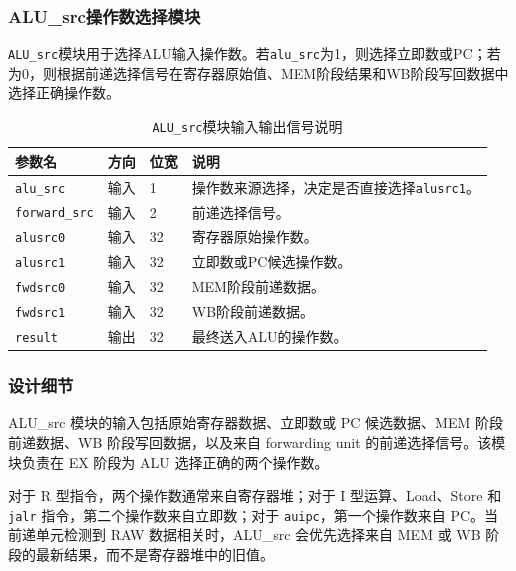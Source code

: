 \documentclass[12pt,a4paper]{ctexart}
\newcommand{\code}[1]{\texttt{#1}}
\begin{document}
\subsubsection{ALU\_src操作数选择模块}

\code{ALU\_src}模块用于选择ALU输入操作数。若\code{alu\_src}为1，则选择立即数或PC；若为0，则根据前递选择信号在寄存器原始值、MEM阶段结果和WB阶段写回数据中选择正确操作数。

\begin{table}[H]
	\centering
	\caption{\code{ALU\_src}模块输入输出信号说明}
	\footnotesize
	\renewcommand{\arraystretch}{1.15}
	\begin{tabularx}{\textwidth}{p{3.2cm}p{1.5cm}p{2.1cm}X}
		\toprule
		参数名                 & 方向 & 位宽 & 说明                              \\
		\midrule
		\code{alu\_src}     & 输入 & 1  & 操作数来源选择，决定是否直接选择\code{alusrc1}。 \\
		\code{forward\_src} & 输入 & 2  & 前递选择信号。                         \\
		\code{alusrc0}      & 输入 & 32 & 寄存器原始操作数。                       \\
		\code{alusrc1}      & 输入 & 32 & 立即数或PC候选操作数。                    \\
		\code{fwdsrc0}      & 输入 & 32 & MEM阶段前递数据。                      \\
		\code{fwdsrc1}      & 输入 & 32 & WB阶段前递数据。                       \\
		\code{result}       & 输出 & 32 & 最终送入ALU的操作数。                    \\
		\bottomrule
	\end{tabularx}
\end{table}

\subsubsection*{设计细节}

ALU\_src 模块的输入包括原始寄存器数据、立即数或 PC 候选数据、MEM 阶段前递数据、WB 阶段写回数据，以及来自 forwarding unit 的前递选择信号。该模块负责在 EX 阶段为 ALU 选择正确的两个操作数。

对于 R 型指令，两个操作数通常来自寄存器堆；对于 I 型运算、Load、Store 和 \code{jalr} 指令，第二个操作数来自立即数；对于 \code{auipc}，第一个操作数来自 PC。当前递单元检测到 RAW 数据相关时，ALU\_src 会优先选择来自 MEM 或 WB 阶段的最新结果，而不是寄存器堆中的旧值。
\end{document}
